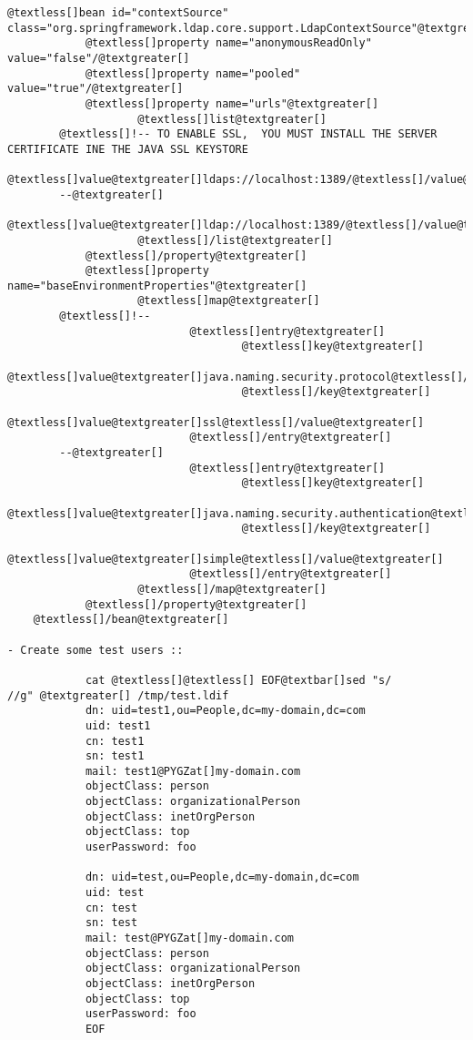 \documentclass[letterpaper,10pt,english]{sphinxmanual}
\begin{document}
\begin{itemize}
\begin{Verbatim}[commandchars=@\[\]]
    @textless[]bean id="contextSource" class="org.springframework.ldap.core.support.LdapContextSource"@textgreater[]
            @textless[]property name="anonymousReadOnly" value="false"/@textgreater[]
            @textless[]property name="pooled" value="true"/@textgreater[]
            @textless[]property name="urls"@textgreater[]
                    @textless[]list@textgreater[]
        @textless[]!-- TO ENABLE SSL,  YOU MUST INSTALL THE SERVER CERTIFICATE INE THE JAVA SSL KEYSTORE
                            @textless[]value@textgreater[]ldaps://localhost:1389/@textless[]/value@textgreater[]
        --@textgreater[]
                            @textless[]value@textgreater[]ldap://localhost:1389/@textless[]/value@textgreater[]
                    @textless[]/list@textgreater[]
            @textless[]/property@textgreater[]
            @textless[]property name="baseEnvironmentProperties"@textgreater[]
                    @textless[]map@textgreater[]
        @textless[]!--
                            @textless[]entry@textgreater[]
                                    @textless[]key@textgreater[]
                                            @textless[]value@textgreater[]java.naming.security.protocol@textless[]/value@textgreater[]
                                    @textless[]/key@textgreater[]
                                    @textless[]value@textgreater[]ssl@textless[]/value@textgreater[]
                            @textless[]/entry@textgreater[]
        --@textgreater[]
                            @textless[]entry@textgreater[]
                                    @textless[]key@textgreater[]
                                            @textless[]value@textgreater[]java.naming.security.authentication@textless[]/value@textgreater[]
                                    @textless[]/key@textgreater[]
                                    @textless[]value@textgreater[]simple@textless[]/value@textgreater[]
                            @textless[]/entry@textgreater[]
                    @textless[]/map@textgreater[]
            @textless[]/property@textgreater[]
    @textless[]/bean@textgreater[]

- Create some test users ::

            cat @textless[]@textless[] EOF@textbar[]sed "s/                    //g" @textgreater[] /tmp/test.ldif
            dn: uid=test1,ou=People,dc=my-domain,dc=com
            uid: test1
            cn: test1
            sn: test1
            mail: test1@PYGZat[]my-domain.com
            objectClass: person
            objectClass: organizationalPerson
            objectClass: inetOrgPerson
            objectClass: top
            userPassword: foo

            dn: uid=test,ou=People,dc=my-domain,dc=com
            uid: test
            cn: test
            sn: test
            mail: test@PYGZat[]my-domain.com
            objectClass: person
            objectClass: organizationalPerson
            objectClass: inetOrgPerson
            objectClass: top
            userPassword: foo
            EOF
\end{Verbatim}

\end{itemize}
\end{document}
